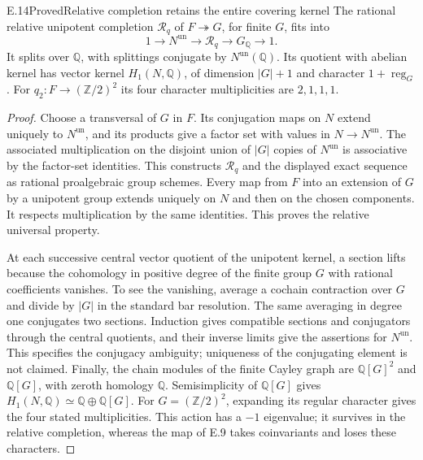 \begin{statement}{E.14}{Proved}{Relative completion retains the entire covering kernel}
The rational relative unipotent completion $\mathcal R_q$ of
$F\twoheadrightarrow G$, for finite $G$, fits into
\[
 1\longrightarrow N^{\mathrm{un}}
 \longrightarrow\mathcal R_q\longrightarrow G_{\mathbb Q}
 \longrightarrow1.
\]
It splits over $\mathbb Q$, with splittings conjugate by
$N^{\mathrm{un}}(\mathbb Q)$. Its quotient with abelian kernel
has vector kernel $H_1(N,\mathbb Q)$, of dimension $|G|+1$ and
character $1+\operatorname{reg}_G$.
For $q_2:F\to(\mathbb Z/2)^2$ its four character
multiplicities are $2,1,1,1$.
\end{statement}
\begin{proof}
Choose a transversal of $G$ in $F$. Its conjugation maps on $N$
extend uniquely to $N^{\mathrm{un}}$, and its products give a
factor set with values in $N\to N^{\mathrm{un}}$.
The associated multiplication on the disjoint union of $|G|$
copies of $N^{\mathrm{un}}$ is associative by the factor-set
identities. This constructs $\mathcal R_q$ and the displayed
exact sequence as rational proalgebraic group schemes.
Every map from $F$ into an extension of $G$ by a unipotent group
extends uniquely on $N$ and then on the chosen components.
It respects multiplication by the same identities. This proves
the relative universal property.

At each successive central vector quotient of the unipotent
kernel, a section lifts because the cohomology in positive
degree of the finite group $G$ with rational coefficients
vanishes. To see the vanishing, average a cochain contraction
over $G$ and divide by $|G|$ in the standard bar resolution.
The same averaging in degree one conjugates two sections.
Induction gives compatible sections and conjugators through
the central quotients, and their inverse limits give the
assertions for $N^{\mathrm{un}}$. This specifies the conjugacy
ambiguity; uniqueness of the conjugating element is not claimed.
Finally, the chain modules of the finite Cayley graph are
$\mathbb Q[G]^2$ and $\mathbb Q[G]$, with zeroth homology
$\mathbb Q$. Semisimplicity of $\mathbb Q[G]$ gives
$H_1(N,\mathbb Q)\simeq\mathbb Q\oplus\mathbb Q[G]$.
For $G=(\mathbb Z/2)^2$, expanding its regular character gives
the four stated multiplicities. This action has a $-1$
eigenvalue; it survives in the relative completion, whereas
the map of E.9 takes coinvariants and loses these characters.
\end{proof}

